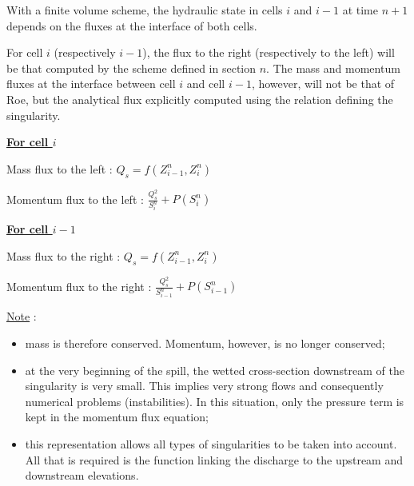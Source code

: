 \vspace{0.5cm}

With a finite volume scheme, the hydraulic state in cells $i$ and $i-1$ at time $n+1$ depends on the fluxes at the interface of both cells.

\vspace{0.5cm}

For cell $i$ (respectively $i-1$), the flux to the right (respectively to the left) will be that computed by the scheme defined in section $n$. The mass and momentum fluxes at the interface between cell $i$ and cell $i-1$, however, will not be that of Roe, but the analytical flux explicitly computed using the relation defining the singularity.

\vspace{0.5cm}

\textbf{\underline{For cell $i$}}

\vspace{0.5cm}

Mass flux to the left : $Q_s =f(Z_{i-1}^n,Z_{i}^n)$

Momentum flux to the left : $\frac{Q_{s}^2}{S_{i}^n} + P(S_{i}^n)$

\vspace{0.5cm}

\textbf{\underline{For cell $i-1$}}

\vspace{0.5cm}

Mass flux to the right : $Q_s =f(Z_{i-1}^n,Z_{i}^n)$

Momentum flux to the right : $\frac{Q_{s}^2}{S_{i-1}^n} + P(S_{i-1}^n)$

\vspace{0.5cm}

\underline{Note} : 
\begin{itemize}
 \item mass is therefore conserved. Momentum, however, is no longer conserved;
 \item at the very beginning of the spill, the wetted cross-section downstream of the singularity is very small. This implies very strong flows and consequently numerical problems (instabilities). In this situation, only the pressure term is kept in the momentum flux equation;
 \item this representation allows all types of singularities to be taken into account. All that is required is the function linking the discharge to the upstream and downstream elevations.
\end{itemize}

